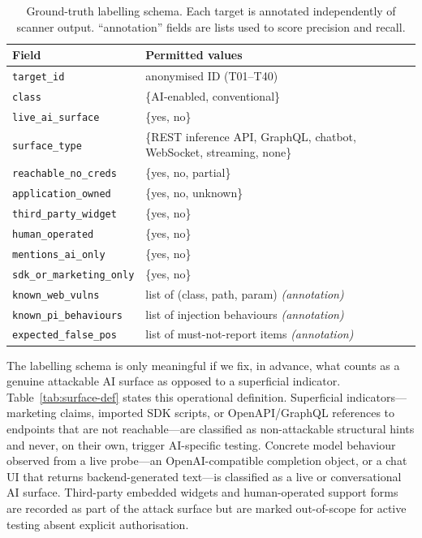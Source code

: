 \begin{table}[t]
\centering
\caption{Ground-truth labelling schema. Each target is annotated
independently of scanner output. ``annotation'' fields are lists used to score
precision and recall.}
\label{tab:gt-schema}
\small
\begin{tabular}{@{}lp{3.9cm}@{}}
\toprule
\textbf{Field} & \textbf{Permitted values} \\
\midrule
\texttt{target\_id}            & anonymised ID (T01--T40) \\
\texttt{class}                 & \{AI-enabled, conventional\} \\
\texttt{live\_ai\_surface}     & \{yes, no\} \\
\texttt{surface\_type}         & \{REST inference API, GraphQL, chatbot, WebSocket, streaming, none\} \\
\texttt{reachable\_no\_creds}  & \{yes, no, partial\} \\
\texttt{application\_owned}    & \{yes, no, unknown\} \\
\texttt{third\_party\_widget}  & \{yes, no\} \\
\texttt{human\_operated}       & \{yes, no\} \\
\texttt{mentions\_ai\_only}    & \{yes, no\} \\
\texttt{sdk\_or\_marketing\_only} & \{yes, no\} \\
\midrule
\texttt{known\_web\_vulns}     & list of (class, path, param) \emph{(annotation)} \\
\texttt{known\_pi\_behaviours} & list of injection behaviours \emph{(annotation)} \\
\texttt{expected\_false\_pos}  & list of must-not-report items \emph{(annotation)} \\
\bottomrule
\end{tabular}
\end{table}

The labelling schema is only meaningful if we fix, in advance, what counts as a
genuine attackable AI surface as opposed to a superficial indicator.
Table~\ref{tab:surface-def} states this operational definition. Superficial
indicators—marketing claims, imported SDK scripts, or OpenAPI/GraphQL
references to endpoints that are not reachable—are classified as non-attackable
structural hints and never, on their own, trigger AI-specific testing. Concrete
model behaviour observed from a live probe—an OpenAI-compatible completion
object, or a chat UI that returns backend-generated text—is classified as a
live or conversational AI surface. Third-party embedded widgets and
human-operated support forms are recorded as part of the attack surface but are
marked out-of-scope for active testing absent explicit authorisation.

